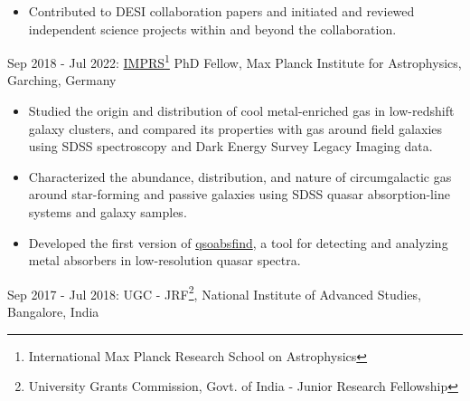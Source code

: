 \documentclass[12pt,letterpaper]{article}
\begin{document}
\begin{list}{}{\cvlist}
\begin{itemize}
  \item Contributed to DESI collaboration papers and initiated and reviewed independent science projects within and beyond the collaboration.

  \vspace{-1mm}
\end{itemize}

\item Sep 2018 - Jul 2022: \href{https://www.imprs-astro.mpg.de/content/student-class-2018-2021.html}{IMPRS\footnote{International Max Planck Research School on Astrophysics} PhD Fellow}, Max Planck Institute for Astrophysics, Garching, Germany
\begin{itemize}

  \item Studied the origin and distribution of cool metal-enriched gas in low-redshift galaxy clusters, and compared its properties with gas around field galaxies using SDSS spectroscopy and Dark Energy Survey Legacy Imaging data.

  \item Characterized the abundance, distribution, and nature of circumgalactic gas around star-forming and passive galaxies using SDSS quasar absorption-line systems and galaxy samples.

  \item Developed the first version of \href{https://github.com/abhi0395/qsoabsfind}{qsoabsfind}, a tool for detecting and analyzing metal absorbers in low-resolution quasar spectra.

\end{itemize}

\item Sep 2017 - Jul 2018: UGC - JRF\footnote{University Grants Commission, Govt. of India - Junior Research Fellowship}, National Institute of Advanced Studies, Bangalore, India
\end{list}
\vspace{-1.5mm}
\end{document}
